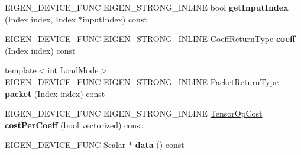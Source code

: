 \begin{DoxyCompactItemize}
E\+I\+G\+E\+N\+\_\+\+D\+E\+V\+I\+C\+E\+\_\+\+F\+U\+NC E\+I\+G\+E\+N\+\_\+\+S\+T\+R\+O\+N\+G\+\_\+\+I\+N\+L\+I\+NE bool {\bfseries get\+Input\+Index} (Index index, Index $\ast$input\+Index) const
\item 
\mbox{\label{struct_eigen_1_1_tensor_evaluator_3_01const_01_tensor_inflation_op_3_01_strides_00_01_arg_type_01_4_00_01_device_01_4_a8749f2eac742c230a78f6f1c07e7825c}} 
E\+I\+G\+E\+N\+\_\+\+D\+E\+V\+I\+C\+E\+\_\+\+F\+U\+NC E\+I\+G\+E\+N\+\_\+\+S\+T\+R\+O\+N\+G\+\_\+\+I\+N\+L\+I\+NE Coeff\+Return\+Type {\bfseries coeff} (Index index) const
\item 
\mbox{\label{struct_eigen_1_1_tensor_evaluator_3_01const_01_tensor_inflation_op_3_01_strides_00_01_arg_type_01_4_00_01_device_01_4_ae452608e45bc4cf4e1fd6ba1954e4c04}} 
{\footnotesize template$<$int Load\+Mode$>$ }\\E\+I\+G\+E\+N\+\_\+\+D\+E\+V\+I\+C\+E\+\_\+\+F\+U\+NC E\+I\+G\+E\+N\+\_\+\+S\+T\+R\+O\+N\+G\+\_\+\+I\+N\+L\+I\+NE \hyperlink{group___sparse_core___module}{Packet\+Return\+Type} {\bfseries packet} (Index index) const
\item 
\mbox{\label{struct_eigen_1_1_tensor_evaluator_3_01const_01_tensor_inflation_op_3_01_strides_00_01_arg_type_01_4_00_01_device_01_4_aedaf7599f20c726ca5ddce4d93757e4b}} 
E\+I\+G\+E\+N\+\_\+\+D\+E\+V\+I\+C\+E\+\_\+\+F\+U\+NC E\+I\+G\+E\+N\+\_\+\+S\+T\+R\+O\+N\+G\+\_\+\+I\+N\+L\+I\+NE \hyperlink{class_eigen_1_1_tensor_op_cost}{Tensor\+Op\+Cost} {\bfseries cost\+Per\+Coeff} (bool vectorized) const
\item 
\mbox{\label{struct_eigen_1_1_tensor_evaluator_3_01const_01_tensor_inflation_op_3_01_strides_00_01_arg_type_01_4_00_01_device_01_4_a49a1de1adebda60c42167cf8eced903d}} 
E\+I\+G\+E\+N\+\_\+\+D\+E\+V\+I\+C\+E\+\_\+\+F\+U\+NC Scalar $\ast$ {\bfseries data} () const
\item 
\mbox{\label{struct_eigen_1_1_tensor_evaluator_3_01const_01_tensor_inflation_op_3_01_strides_00_01_arg_type_01_4_00_01_device_01_4_ae7e3796fb5da2e23b467373d571944dd}} 

\end{DoxyCompactItemize}

